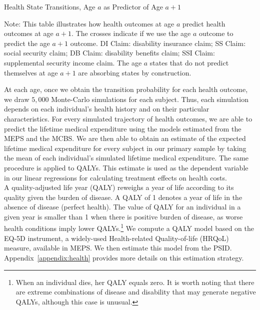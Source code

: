 \begin{table}
\begin{threeparttable}
\caption{Health State Transitions, Age $a$ as Predictor of Age $a+1$}\label{table:transition}
\scriptsize

\begin{tablenotes}
\footnotesize
\item Note: This table illustrates how health outcomes at age $a$ predict health outcomes at age $a+1$. The crosses indicate if we use the age $a$ outcome to predict the age $a+1$ outcome. DI Claim: disability insurance claim; SS Claim: social security claim; DB Claim: disability benefits claim; SSI Claim: supplemental security income claim. The age $a$ states that do not predict themselves at age $a+1$ are absorbing states by construction.
\end{tablenotes}
\end{threeparttable}
\end{table}

\noindent At each age, once we obtain the transition probability for each health outcome, we draw $5,000$ Monte-Carlo simulations for each subject. Thus, each simulation depends on each individual's health history and on their particular characteristics. For every simulated trajectory of health outcomes, we are able to predict the lifetime medical expenditure using the models estimated from the MEPS and the MCBS. We are then able to obtain an estimate of the expected lifetime medical expenditure for every subject in our primary sample by taking the mean of each individual's simulated lifetime medical expenditure. The same procedure is applied to QALYs. This estimate is used as the dependent variable in our linear regressions for calculating treatment effects on health costs. \\

\noindent A quality-adjusted life year (QALY) reweighs a year of life according to its quality given the burden of disease. A QALY of 1 denotes a year of life in the absence of disease (perfect health). The value of QALY for an individual in a given year is smaller than 1 when there is positive burden of disease, as worse health conditions imply lower QALYs.\footnote{When an individual dies, her QALY equals zero. It is worth noting that there are extreme combinations of disease and disability that may generate negative QALYs, although this case is unusual.} We compute a QALY model based on the EQ-5D instrument, a widely-used Health-related Quality-of-life (HRQoL) measure, available in MEPS. We then estimate this model from the PSID. Appendix~\ref{appendix:health} provides more details on this estimation strategy. \\

